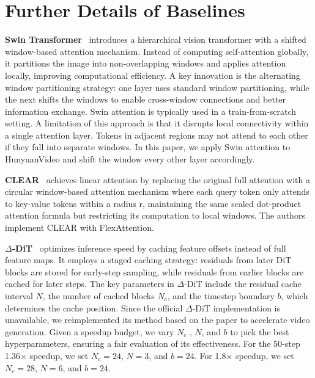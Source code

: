 



\section{Further Details of Baselines}
\label{sec:baseline}
\textbf{Swin Transformer}~\citep{liu2021swintransformerhierarchicalvision} introduces a hierarchical vision transformer with a shifted window-based attention mechanism. Instead of computing self-attention globally, it partitions the image into non-overlapping windows and applies attention locally, improving computational efficiency. A key innovation is the alternating window partitioning strategy: one layer uses standard window partitioning, while the next shifts the windows to enable cross-window connections and better information exchange. Swin attention is typically used in a train-from-scratch setting. A limitation of this approach is that it disrupts local connectivity within a single attention layer. Tokens in adjacent regions may not attend to each other if they fall into separate windows. In this paper, we apply Swin attention to HunyuanVideo and shift the window every other layer accordingly.


\textbf{CLEAR}~\citep{liu2024clearconvlikelinearizationrevs} achieves linear attention by replacing the original full attention with a circular window-based attention mechanism where each query token only attends to key-value tokens within a radius r, maintaining the same scaled dot-product attention formula but restricting its computation to local windows. The authors implement CLEAR with FlexAttention. 


\textbf{$\Delta$-DiT}~\citep{chen2024delta} optimizes inference speed by caching feature offsets instead of full feature maps. It employs a staged caching strategy: residuals from later DiT blocks are stored for early-step sampling, while residuals from earlier blocks are cached for later steps. The key parameters in \(\Delta\text{-DiT}\) include the residual cache interval \(N\), the number of cached blocks \(N_c\), and the timestep boundary \(b\), which determines the cache position. Since the official \(\Delta\text{-DiT}\) implementation is unavailable, we reimplemented its method based on the paper to accelerate video generation. Given a speedup budget, we vary \(N_c\) , \(N\), and \(b\) to pick the best hyperparameters, ensuring a fair evaluation of its effectiveness. For the 50-step 1.36$\times$ speedup, we set \(N_c=24\), \(N=3\), and \(b=24\). For 1.8$\times$ speedup, we set  \(N_c=28\), \(N=6\), and \(b=24\).


